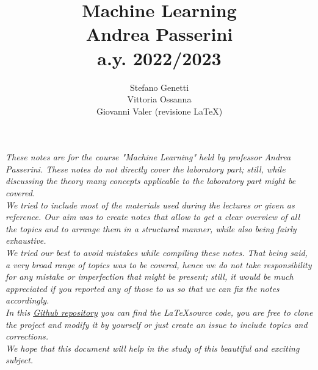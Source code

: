 

\title{\Huge \textbf{Machine Learning\\} \Large{Andrea Passerini\\a.y. 2022/2023}}

\author{Stefano Genetti\\Vittoria Ossanna\\Giovanni Valer (revisione \LaTeX)}


\maketitle

\newpage
\textit{These notes are for the course "Machine Learning" held by professor Andrea Passerini. These notes do not directly cover the laboratory part; still, while discussing the theory many concepts applicable to the laboratory part might be covered. \\
We tried to include most of the materials used during the lectures or given as reference. Our aim was to create notes that allow to get a clear overview of all the topics and to arrange them in a structured manner, while also being fairly exhaustive.\\
We tried our best to avoid mistakes while compiling these notes. That being said, a very broad range of topics was to be covered, hence we do not take responsibility for any mistake or imperfection that might be present; still, it would be much appreciated if you reported any of those to us so that we can fix the notes accordingly.\\
In this \href{https://github.com/StefanoGenettiUniTN/MachineLearning_Passerini.git}{Github repository} you can find the \LaTeX source code, you are free to clone the project and modify it by yourself or just create an issue to include topics and corrections.\\
We hope that this document will help in the study of this beautiful and exciting subject.}

\newpage

\tableofcontents


    
    
    
    
    
    
    
    
    
    
    
    
    
    
    
    
    
    

